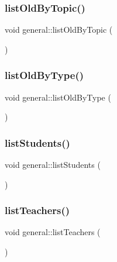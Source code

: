 \mbox{\label{classgeneral_a9b807786a1b42c2b779ad70b087a8639}} 
\subsubsection{\texorpdfstring{list\+Old\+By\+Topic()}{listOldByTopic()}}
{\footnotesize\ttfamily void general\+::list\+Old\+By\+Topic (\begin{DoxyParamCaption}{ }\end{DoxyParamCaption})}

\mbox{\label{classgeneral_a5e876d3404285e2c89ea7969c964600d}} 
\subsubsection{\texorpdfstring{list\+Old\+By\+Type()}{listOldByType()}}
{\footnotesize\ttfamily void general\+::list\+Old\+By\+Type (\begin{DoxyParamCaption}{ }\end{DoxyParamCaption})}

\mbox{\label{classgeneral_aa665c4f70405eae43862283c8f1c4268}} 
\subsubsection{\texorpdfstring{list\+Students()}{listStudents()}}
{\footnotesize\ttfamily void general\+::list\+Students (\begin{DoxyParamCaption}{ }\end{DoxyParamCaption})}

\mbox{\label{classgeneral_aff78b35c2e50ad021d061977c4add3d8}} 
\subsubsection{\texorpdfstring{list\+Teachers()}{listTeachers()}}
{\footnotesize\ttfamily void general\+::list\+Teachers (\begin{DoxyParamCaption}{ }\end{DoxyParamCaption})}

